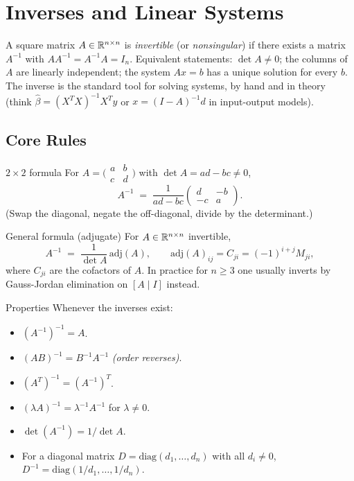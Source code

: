 \chapter{Inverses and Linear Systems}

A square matrix $A \in \mathbb{R}^{n \times n}$ is \emph{invertible} (or
\emph{nonsingular}) if there exists a matrix $A^{-1}$ with
$A A^{-1} = A^{-1} A = I_{n}$. Equivalent statements: $\det A \neq 0$; the
columns of $A$ are linearly independent; the system $A x = b$ has a unique
solution for every $b$. The inverse is the standard tool for solving systems,
by hand and in theory (think $\hat{\beta} = (X^{T} X)^{-1} X^{T} y$ or
$x = (I - A)^{-1} d$ in input-output models).

\section{Core Rules}

\begin{rulebox}{$2 \times 2$ formula}
For $A = \bigl(\begin{smallmatrix} a & b \\ c & d \end{smallmatrix}\bigr)$
with $\det A = a d - b c \neq 0$,
\[
A^{-1} \;=\; \frac{1}{a d - b c} \begin{pmatrix} d & -b \\ -c & a \end{pmatrix}.
\]
(Swap the diagonal, negate the off-diagonal, divide by the determinant.)
\end{rulebox}

\begin{rulebox}{General formula (adjugate)}
For $A \in \mathbb{R}^{n \times n}$ invertible,
\[
A^{-1} \;=\; \frac{1}{\det A} \, \mathrm{adj}(A), \qquad
\mathrm{adj}(A)_{ij} = C_{ji} = (-1)^{i + j} M_{ji},
\]
where $C_{ji}$ are the cofactors of $A$. In practice for $n \ge 3$ one
usually inverts by Gauss-Jordan elimination on $[A \mid I]$ instead.
\end{rulebox}

\begin{rulebox}{Properties}
Whenever the inverses exist:
\begin{itemize}[leftmargin=1.6em,itemsep=0.3ex]
    \item $(A^{-1})^{-1} = A$.
    \item $(A B)^{-1} = B^{-1} A^{-1}$ \emph{(order reverses)}.
    \item $(A^{T})^{-1} = (A^{-1})^{T}$.
    \item $(\lambda A)^{-1} = \lambda^{-1} A^{-1}$ for $\lambda \neq 0$.
    \item $\det(A^{-1}) = 1 / \det A$.
    \item For a diagonal matrix $D = \mathrm{diag}(d_{1}, \dots, d_{n})$
          with all $d_{i} \neq 0$,
          $D^{-1} = \mathrm{diag}(1/d_{1}, \dots, 1/d_{n})$.
\end{itemize}
\end{rulebox}

